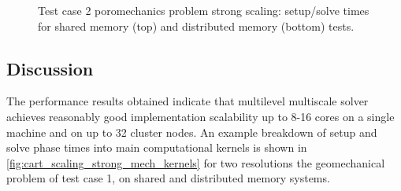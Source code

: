 \begin{figure} [htbp]
  \begin{subfigure}[t]{0.48\textwidth}
    \centering
    
  \end{subfigure}
  \hfill
  \begin{subfigure}[t]{0.48\textwidth}
  \hspace{\textwidth}
  \end{subfigure}
  \begin{subfigure}[t]{0.48\textwidth}
    \centering
    
  \end{subfigure}
  \hfill
  \begin{subfigure}[t]{0.48\textwidth}
    \centering
    
  \end{subfigure}
  \caption[Test case 2 poromechanics problem strong scaling]{Test case 2 poromechanics problem strong scaling: setup/solve times for shared memory (top) and distributed memory (bottom) tests.}
  \label{fig:mazumodel2_scaling_strong_poro}
\end{figure}

\subsection{Discussion}

The performance results obtained indicate that multilevel multiscale solver achieves reasonably good implementation scalability up to 8-16 cores on a single machine and on up to 32 cluster nodes.   An example breakdown of setup and solve phase times into main computational kernels is shown in \cref{fig:cart_scaling_strong_mech_kernels} for two resolutions the geomechanical problem of test case 1, on shared and distributed memory systems.

